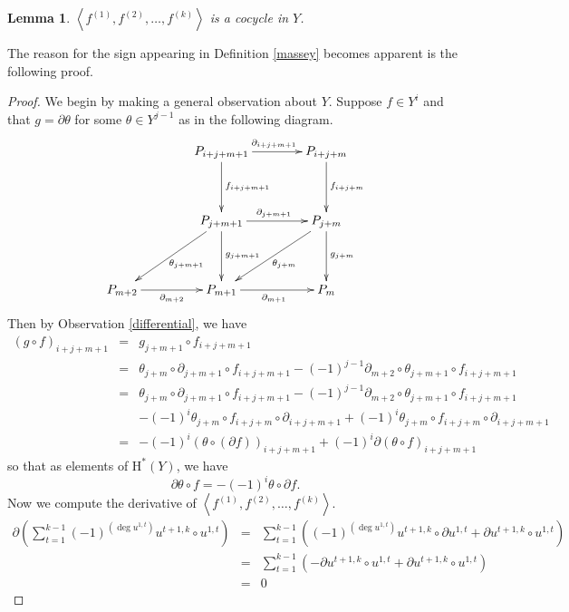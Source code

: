 \documentclass[12pt]{article}
\newtheorem{lemma}[definition]{Lemma}
\begin{document}
\begin{lemma}\label{cocycle}
$\left\langle f^{\left(1\right)},
f^{\left(2\right)},\dots,f^{\left(k\right)}\right\rangle$
is a cocycle in $Y$.
\end{lemma}
The reason for the sign appearing 
in Definition \ref{massey} becomes apparent
is the following proof.
\begin{proof}
We begin by making a general observation about $Y$.
Suppose $f\in Y^i$ and that $g=\partial\theta$
for some $\theta\in Y^{j-1}$ as in the following diagram.
\[\xymatrix@+15pt{
&P_{i+j+m+1}\ar[r]^{\partial_{i+j+m+1}}\ar[d]^{f_{i+j+m+1}}
&P_{i+j+m}\ar[d]^{f_{i+j+m}}
\\
&P_{j+m+1}\ar[r]^{\partial_{j+m+1}}
\ar[d]^{g_{j+m+1}}\ar[dl]^{\theta_{j+m+1}}
&P_{j+m}\ar[d]^{g_{j+m}}\ar[dl]^{\theta_{j+m}}
\\
P_{m+2}\ar[r]_{\partial_{m+2}}
&P_{m+1}\ar[r]_{\partial_{m+1}}
&P_m
}\]
Then by Observation \ref{differential}, we have
\begin{eqnarray*}
\left(g\circ f\right)_{i+j+m+1}
&=&g_{j+m+1}\circ f_{i+j+m+1}\\
&=&\theta_{j+m}\circ\partial_{j+m+1}\circ f_{i+j+m+1}
-\left(-1\right)^{j-1}
\partial_{m+2}\circ\theta_{j+m+1}\circ f_{i+j+m+1}\\
&=&\theta_{j+m}\circ\partial_{j+m+1}\circ f_{i+j+m+1}
-\left(-1\right)^{j-1}
\partial_{m+2}\circ\theta_{j+m+1}\circ f_{i+j+m+1}\\
&&
-\left(-1\right)^i\theta_{j+m}\circ f_{i+j+m}\circ\partial_{i+j+m+1}
+\left(-1\right)^i\theta_{j+m}\circ f_{i+j+m}\circ\partial_{i+j+m+1}\\
&=&-\left(-1\right)^i
\left(\theta\circ\left(\partial f\right)\right)_{i+j+m+1} 
+\left(-1\right)^i \partial\left(\theta\circ f\right)_{i+j+m+1}
\end{eqnarray*}
so that as elements of $\mathrm{H}^\ast\left(Y\right)$, we have
\begin{equation}
\partial\theta\circ f
=-\left(-1\right)^i\theta\circ\partial f.\end{equation}
Now we compute the derivative of
$\left\langle f^{\left(1\right)},
f^{\left(2\right)},\dots,f^{\left(k\right)}\right\rangle$.
\begin{eqnarray*}
\partial\left(\sum_{t=1}^{k-1}
\left(-1\right)^{\left(\deg u^{1,t}\right)}
u^{t+1,k}\circ u^{1,t}\right)
&=&\sum_{t=1}^{k-1}\left(
\left(-1\right)^{\left(\deg u^{1,t}\right)}
u^{t+1,k}\circ
\partial u^{1,t}
+\partial u^{t+1,k}\circ
u^{1,t}
\right)\\
&=&\sum_{t=1}^{k-1}\left(
-\partial u^{t+1,k}\circ
u^{1,t}
+\partial u^{t+1,k}\circ
u^{1,t}
\right)\\
&=&0
\end{eqnarray*}
\end{proof}
\end{document}
